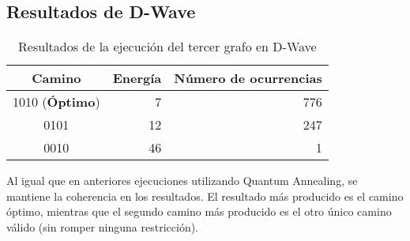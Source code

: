 \documentclass{article}
\begin{document}
\subsection{Resultados de D-Wave}
\begin{table}[htbp]
  \centering
  \begin{tabular}{|c|r|r|}
    \hline
    \textbf{Camino} & \textbf{Energía} & \textbf{Número de ocurrencias} \\ \hline
    1010 (\textbf{Óptimo}) &  7 & 776 \\ \hline
    0101                   & 12 & 247 \\ \hline
    0010                   & 46 &   1 \\ \hline
  \end{tabular}
  \caption{Resultados de la ejecución del tercer grafo en D-Wave}
\end{table}

Al igual que en anteriores ejecuciones utilizando Quantum Annealing, se mantiene la coherencia en los resultados. El resultado más producido es el camino óptimo, mientras que el segundo camino más producido es el otro único camino válido (sin romper ninguna restricción).



\end{document}
